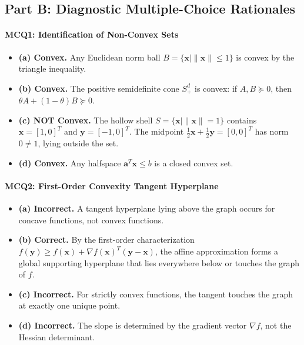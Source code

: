 \subsection*{Part B: Diagnostic Multiple-Choice Rationales}

\paragraph{MCQ1: Identification of Non-Convex Sets}
\begin{itemize}
    \item \textbf{(a) Convex.} Any Euclidean norm ball $B = \{\mathbf{x} \mid \|\mathbf{x}\| \le 1\}$ is convex by the triangle inequality.
    \item \textbf{(b) Convex.} The positive semidefinite cone $S^d_+$ is convex: if $A, B \succeq 0$, then $\theta A + (1-\theta)B \succeq 0$.
    \item \textbf{(c) NOT Convex.} The hollow shell $S = \{\mathbf{x} \mid \|\mathbf{x}\| = 1\}$ contains $\mathbf{x} = [1, 0]^T$ and $\mathbf{y} = [-1, 0]^T$. The midpoint $\frac{1}{2}\mathbf{x} + \frac{1}{2}\mathbf{y} = [0, 0]^T$ has norm $0 \ne 1$, lying outside the set.
    \item \textbf{(d) Convex.} Any halfspace $\mathbf{a}^T \mathbf{x} \le b$ is a closed convex set.
\end{itemize}

\paragraph{MCQ2: First-Order Convexity Tangent Hyperplane}
\begin{itemize}
    \item \textbf{(a) Incorrect.} A tangent hyperplane lying above the graph occurs for concave functions, not convex functions.
    \item \textbf{(b) Correct.} By the first-order characterization $f(\mathbf{y}) \ge f(\mathbf{x}) + \nabla f(\mathbf{x})^T (\mathbf{y} - \mathbf{x})$, the affine approximation forms a global supporting hyperplane that lies everywhere below or touches the graph of $f$.
    \item \textbf{(c) Incorrect.} For strictly convex functions, the tangent touches the graph at exactly one unique point.
    \item \textbf{(d) Incorrect.} The slope is determined by the gradient vector $\nabla f$, not the Hessian determinant.
\end{itemize}

